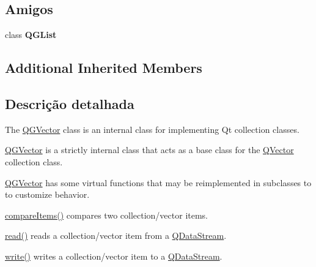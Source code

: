 \subsection*{Amigos}
\begin{DoxyCompactItemize}
\item 
\hypertarget{class_q_g_vector_a9bfde3c3259271cb86b87bd78b399dd5}{class {\bfseries Q\-G\-List}}\label{class_q_g_vector_a9bfde3c3259271cb86b87bd78b399dd5}

\end{DoxyCompactItemize}
\subsection*{Additional Inherited Members}


\subsection{Descrição detalhada}
The \hyperlink{class_q_g_vector}{Q\-G\-Vector} class is an internal class for implementing Qt collection classes. 

\hyperlink{class_q_g_vector}{Q\-G\-Vector} is a strictly internal class that acts as a base class for the \hyperlink{class_q_vector}{Q\-Vector} collection class.

\hyperlink{class_q_g_vector}{Q\-G\-Vector} has some virtual functions that may be reimplemented in subclasses to to customize behavior.


\begin{DoxyItemize}
\item \hyperlink{class_q_g_vector_ad0ea8a3a57df730076ce9f6d3de7775a}{compare\-Items()} compares two collection/vector items. 
\item \hyperlink{structcmd_8h_a9c7b76d5266903891c803132d51ccb90}{read()} reads a collection/vector item from a \hyperlink{class_q_data_stream}{Q\-Data\-Stream}. 
\item \hyperlink{structcmd_8h_af2a3ea719b83f672637febdd87c36c36}{write()} writes a collection/vector item to a \hyperlink{class_q_data_stream}{Q\-Data\-Stream}. 
\end{DoxyItemize}

